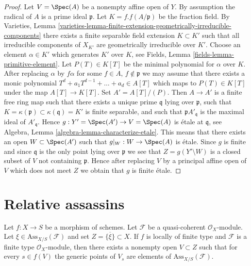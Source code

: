 \begin{proof}
Let $V = \Spec(A)$ be a nonempty affine open of $Y$.
By assumption the radical of $A$ is a prime ideal $\mathfrak p$.
Let $K = f.f(A/\mathfrak p)$ be the fraction field. By
Varieties, Lemma
\ref{varieties-lemma-finite-extension-geometrically-irreducible-components}
there exists a finite separable field extension
$K \subset K'$ such that all irreducible components of $X_{K'}$ are
geometrically irreducible over $K'$.
Choose an element $\alpha \in K'$ which generates $K'$ over
$K$, see
Fields, Lemma \ref{fields-lemma-primitive-element}.
Let $P(T) \in K[T]$ be the minimal polynomial for $\alpha$ over $K$.
After replacing $\alpha$ by $f \alpha$ for some
$f \in A$, $f \not \in \mathfrak p$
we may assume that there exists a monic polynomial
$T^d + a_1T^{d - 1} + \ldots + a_d \in A[T]$ which maps to
$P(T) \in K[T]$ under the map $A[T] \to K[T]$.
Set $A' = A[T]/(P)$. Then $A \to A'$ is a finite free ring map
such that there exists a unique prime $\mathfrak q$ lying over
$\mathfrak p$, such that
$K = \kappa(\mathfrak p) \subset \kappa(\mathfrak q) = K'$
is finite separable, and such that $\mathfrak pA'_{\mathfrak q}$
is the maximal ideal of $A'_{\mathfrak q}$.
Hence $g : Y' = \Spec(A') \to V = \Spec(A)$
is \'etale at $\mathfrak q$, see
Algebra, Lemma \ref{algebra-lemma-characterize-etale}.
This means that there exists an open $W \subset \Spec(A')$ such
that $g|_W : W \to \Spec(A)$ is \'etale.
Since $g$ is finite and since $\mathfrak q$ is the only point lying over
$\mathfrak p$ we see that $Z = g(Y' \setminus W)$ is a closed subset of $V$
not containing $\mathfrak p$. Hence after replacing $V$ by a principal
affine open of $V$ which does not meet $Z$ we obtain that $g$ is finite
\'etale.
\end{proof}







\section{Relative assassins}
\label{section-assassin}

\begin{lemma}
\label{lemma-relative-assassin-in-neighbourhood}
Let $f : X \to S$ be a morphism of schemes.
Let $\mathcal{F}$ be a quasi-coherent $\mathcal{O}_X$-module.
Let $\xi \in \text{Ass}_{X/S}(\mathcal{F})$ and set
$Z = \overline{\{\xi\}} \subset X$.
If $f$ is locally of finite type and $\mathcal{F}$ is a
finite type $\mathcal{O}_X$-module, then there exists a nonempty
open $V \subset Z$ such that for every $s \in f(V)$ the generic
points of $V_s$ are elements of $\text{Ass}_{X/S}(\mathcal{F})$.
\end{lemma}


